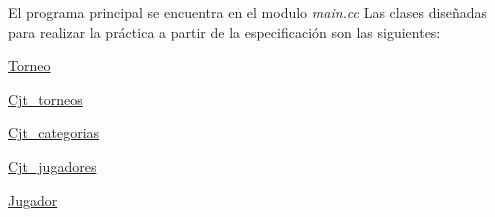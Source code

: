 El programa principal se encuentra en el modulo {\itshape main.\+cc} Las clases diseñadas para realizar la práctica a partir de la especificación son las siguientes\+: 
\begin{DoxyItemize}
\item \mbox{\hyperlink{class_torneo}{Torneo}} 
\item \mbox{\hyperlink{class_cjt__torneos}{Cjt\+\_\+torneos}} 
\item \mbox{\hyperlink{class_cjt__categorias}{Cjt\+\_\+categorias}} 
\item \mbox{\hyperlink{class_cjt__jugadores}{Cjt\+\_\+jugadores}} 
\item \mbox{\hyperlink{class_jugador}{Jugador}} 
\end{DoxyItemize}